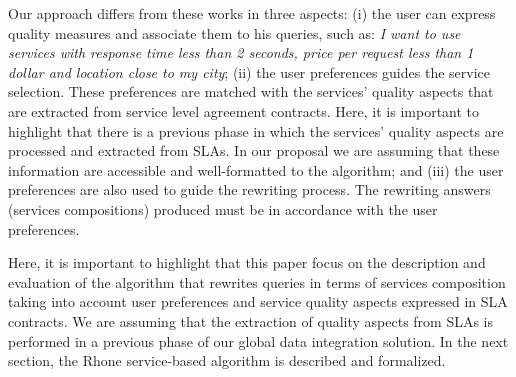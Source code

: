 Our approach differs from these works in three aspects:
(i) the user can express quality measures and associate them
to his queries, such as: \textit{I want to use services with response
time less than 2 seconds, price per request less than 1 dollar
and location close to my city}; 
(ii) the user preferences guides the service selection. 
These preferences are matched with the services' quality aspects
that are extracted from service level agreement contracts.
Here, it is important to highlight that there
is a previous phase in which the services' quality aspects are 
processed and extracted from SLAs. 
In our proposal we are assuming that these information are accessible and
well-formatted to the algorithm; and
(iii) the user preferences are also used to guide the rewriting process.
The rewriting answers (services compositions) produced must be in 
accordance with the user preferences.
%


Here, it is important to highlight that this paper focus on the description and
evaluation of the algorithm that rewrites queries in terms of services
composition taking into account user preferences and service quality aspects
expressed in SLA contracts. We are assuming that the extraction of quality
aspects from SLAs is performed in a previous phase of our global data
integration solution. 
In the next section, the Rhone service-based algorithm is described and
formalized.
